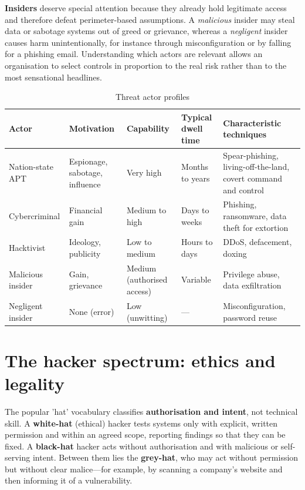 \documentclass[11pt,openany]{book}
\begin{document}
\textbf{Insiders} deserve special attention because they already hold legitimate access and therefore defeat perimeter-based assumptions. A \emph{malicious} insider may steal data or sabotage systems out of greed or grievance, whereas a \emph{negligent} insider causes harm unintentionally, for instance through misconfiguration or by falling for a phishing email. Understanding which actors are relevant allows an organisation to select controls in proportion to the real risk rather than to the most sensational headlines.

\begin{table}[htbp]
  \centering\small
  \caption{Threat actor profiles}
  \begin{tabularx}{\linewidth}{>{\raggedright\arraybackslash}X >{\raggedright\arraybackslash}X >{\raggedright\arraybackslash}X >{\raggedright\arraybackslash}X >{\raggedright\arraybackslash}X}
    \toprule
    \textbf{Actor} & \textbf{Motivation} & \textbf{Capability} & \textbf{Typical dwell time} & \textbf{Characteristic techniques} \\
    \midrule
    Nation-state APT & Espionage, sabotage, influence & Very high & Months to years & Spear-phishing, living-off-the-land, covert command and control \\
    Cybercriminal & Financial gain & Medium to high & Days to weeks & Phishing, ransomware, data theft for extortion \\
    Hacktivist & Ideology, publicity & Low to medium & Hours to days & DDoS, defacement, doxing \\
    Malicious insider & Gain, grievance & Medium (authorised access) & Variable & Privilege abuse, data exfiltration \\
    Negligent insider & None (error) & Low (unwitting) & — & Misconfiguration, password reuse \\
    \bottomrule
  \end{tabularx}
\end{table}
\section{The hacker spectrum: ethics and legality}\label{sec:3.2}
The popular 'hat' vocabulary classifies \textbf{authorisation and intent}, not technical skill. A \textbf{white-hat} (ethical) hacker tests systems only with explicit, written permission and within an agreed scope, reporting findings so that they can be fixed. A \textbf{black-hat} hacker acts without authorisation and with malicious or self-serving intent. Between them lies the \textbf{grey-hat}, who may act without permission but without clear malice—for example, by scanning a company's website and then informing it of a vulnerability.
\end{document}
